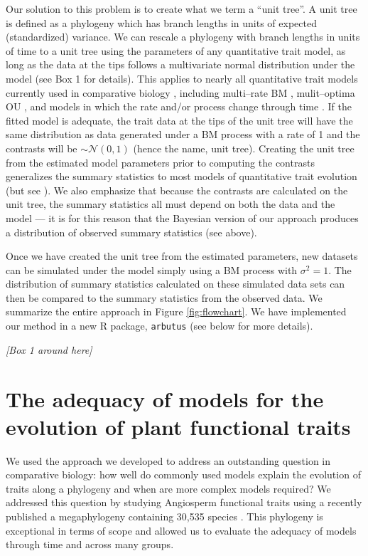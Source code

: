 \documentclass[a4paper,12pt]{article}
\begin{document}
Our solution to this problem is to create what we term a ``unit tree''. A unit tree is defined as a phylogeny which has branch lengths in units of expected (standardized) variance. We can rescale a phylogeny with branch lengths in units of time to a unit tree using the parameters of any quantitative trait model, as long as the data at the tips follows a multivariate normal distribution under the model (see Box 1 for details). This applies to nearly all quantitative trait models currently used in comparative biology \citep{Omeara2012}, including multi--rate BM \citep{Omeara2006, Eastman2011}, mulit--optima OU \citep{ButlerKing2004, Beaulieu2012, UyedaBayou}, and models in which the rate and/or process change through time \citep{Blomberg2003, SlaterMEE}. If the fitted model is adequate, the trait data at the tips of the unit tree will have the same distribution as data generated under a BM process with a rate of 1 and the contrasts will be $\sim \mathcal{N}(0,1)$ (hence the name, unit tree). Creating the unit tree from the estimated model parameters prior to computing the contrasts generalizes the summary statistics to most models of quantitative trait evolution (but see \citep{Landis2012}). We also emphasize that because the contrasts are calculated on the unit tree, the summary statistics all must depend on both the data and the model --- it is for this reason that the Bayesian version of our approach produces a distribution of observed summary statistics (see above).

Once we have created the unit tree from the estimated parameters, new datasets can be simulated under the model simply using a BM process with $\sigma^2 = 1$. The distribution of summary statistics calculated on these simulated data sets can then be compared to the summary statistics from the observed data. We summarize the entire approach in Figure \ref{fig:flowchart}. We have implemented our method in a new R package, \texttt{arbutus} (see below for more details). 

\begin{center}
\textit{[Box 1 around here]}
\end{center}

\section{The adequacy of models for the evolution of plant functional traits}

We used the approach we developed to address an outstanding question in comparative biology: how well do commonly used models explain the evolution of traits along a phylogeny and when are more complex models required? We addressed this question by studying Angiosperm functional traits using a recently published a megaphylogeny containing 30,535 species \citep{Zanne2013}. This phylogeny is exceptional in terms of scope and allowed us to evaluate the adequacy of models through time and across many groups.  
\end{document}
